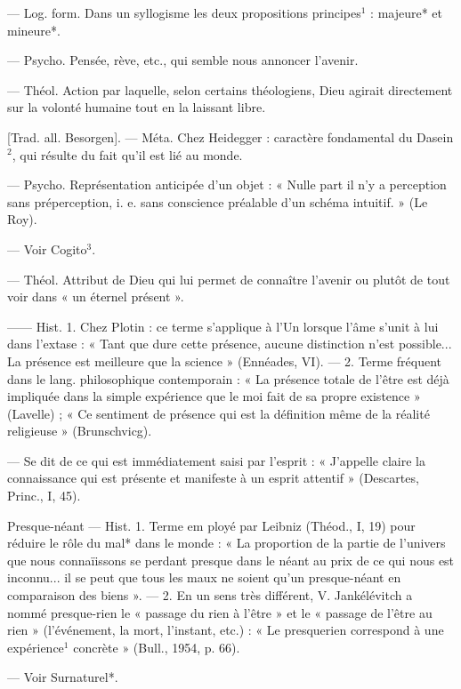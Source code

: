 \begin{itemize}[leftmargin=1cm, label=, itemsep=1pt]
 — Log. form. Dans un syllogisme les deux propositions principes$^1$ : majeure* et mineure*.

 — Psycho. Pensée,
rève, etc., qui semble nous annoncer
l'avenir.

 — Théol. Action
par laquelle, selon certains théologiens, Dieu agirait directement sur
la volonté humaine tout en la laissant libre.

 [Trad. all. Besorgen].
— Méta. Chez Heidegger : caractère
fondamental du Dasein$^2$, qui résulte
du fait qu'il est lié au monde.

 — Psycho. Représentation anticipée d’un objet : « Nulle
part il n'y a perception sans préperception, i. e. sans conscience
préalable d’un schéma intuitif. »
(Le Roy).

 — Voir Cogito$^3$.

 — Théol. Attribut de Dieu
qui lui permet de connaître l’avenir
ou plutôt de tout voir dans « un
éternel présent ».

 —— Hist. 1. Chez Plotin : ce
terme s'applique à l'Un lorsque
l’âme s’unit à lui dans l'extase :
« Tant que dure cette présence,
aucune distinction n’est possible...
La présence est meilleure que la
science » (Ennéades, VI). — 2. Terme
fréquent dans le lang. philosophique
contemporain : « La présence totale
de l’être est déjà impliquée dans la
simple expérience que le moi fait
de sa propre existence » (Lavelle) ;
« Ce sentiment de présence qui est la
définition même de la réalité religieuse » (Brunschvicg).

 — Se dit de ce qui est immédiatement saisi par l'esprit : « J'appelle claire la connaissance qui est
présente et manifeste à un esprit
attentif » (Descartes, Princ., I, 45).

Presque-néant\ib{} — Hist. 1. Terme em
ployé par Leibniz (Théod., I, 19)
pour réduire le rôle du mal* dans
le monde : « La proportion de la
partie de l'univers que nous connaïissons se perdant presque dans le
néant au prix de ce qui nous est
inconnu... il se peut que tous les
maux ne soient qu’un presque-néant
en comparaison des biens ». — 2. En
un sens très différent, V. Jankélévitch a nommé presque-rien le « passage du rien à l’être » et le « passage
de l'être au rien » (l'événement, la
mort, l'instant, etc.) : « Le presquerien correspond à une expérience$^1$
concrète » (Bull., 1954, p. 66).

 — Voir Surnaturel*.


\end{itemize}
